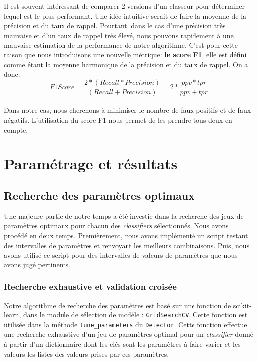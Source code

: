 \documentclass[a4paper]{report}
\begin{document}
\bigskip
Il est souvent intéressant de comparer 2 versions d’un classeur pour déterminer lequel est le plus performant. Une idée intuitive serait de faire la moyenne de la précision et du taux de rappel. Pourtant, dans le cas d’une précision très mauvaise et d’un taux de rappel très élevé, nous pouvons rapidement à une mauvaise estimation de la performance de notre algorithme. C’est pour cette raison que nous introduisons une nouvelle métrique: \textbf{le score F1}. elle est défini comme étant la moyenne harmonique de la précision et du taux de rappel. On a donc:
\begin{equation}

	F1 Score = \dfrac{2*(Recall * Precision)}{(Recall + Precision)} = 2*\dfrac{ppv * tpr}{ppv + tpr}
\end{equation}\\

\medskip
Dans notre cas, nous cherchons à minimiser le nombre de faux positifs et de faux négatifs. L’utilisation du score F1 nous permet de les prendre tous deux en compte.  \\

\chapter{Paramétrage et résultats}

\section{Recherche des paramètres optimaux}

Une majeure partie de notre temps a été investie dans la recherche des jeux de paramètres optimaux pour chacun des \emph{classifiers} sélectionnés. Nous avons procédé en deux temps. Premièrement, nous avons implémenté un script testant des intervalles de paramètres et renvoyant les meilleurs combinaisons. Puis, nous avons utilisé ce script pour des intervalles de valeurs de paramètres que nous avons jugé pertinents.

\subsection{Recherche exhaustive et validation croisée}

Notre algorithme de recherche des paramètres est basé sur une fonction de scikit-learn, dans le module de sélection de modèle : \texttt{GridSearchCV}. Cette fonction est utilisée dans la méthode \texttt{tune\_parameters} du \texttt{Detector}. Cette fonction effectue une recherche exhaustive d'un jeu de paramètres optimal pour un \emph{classifier} donné à partir d'un dictionnaire dont les clés sont les paramètres à faire varier et les valeurs les listes des valeurs prises par ces paramètres.
\end{document}
